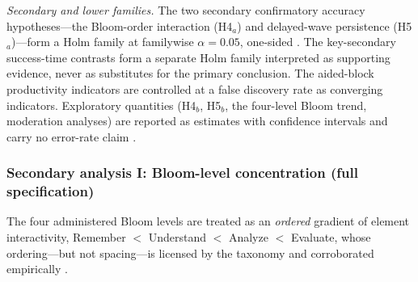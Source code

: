 \emph{Secondary and lower families.} The two secondary confirmatory accuracy hypotheses---the Bloom-order interaction (H4$_a$) and delayed-wave persistence (H5$_a$)---form a Holm family at familywise $\alpha = 0.05$, one-sided \parencite{holm1979}. The key-secondary success-time contrasts form a separate Holm family interpreted as supporting evidence, never as substitutes for the primary conclusion. The aided-block productivity indicators are controlled at a false discovery rate \parencite{benjamini1995} %
as converging indicators. Exploratory quantities (H4$_b$, H5$_b$, the four-level Bloom trend, moderation analyses) are reported as estimates with confidence intervals and carry no error-rate claim \parencite{frumento2025}.

\subsubsection{Secondary analysis I: Bloom-level concentration (full specification)}
\label{app:bloom-analysis}
The four administered Bloom levels are treated as an \emph{ordered} gradient of element interactivity, Remember $<$ Understand $<$ Analyze $<$ Evaluate, whose ordering---but not spacing---is licensed by the taxonomy and corroborated empirically \parencite{anderson2001,krathwohl2002,srinivas2025}.

